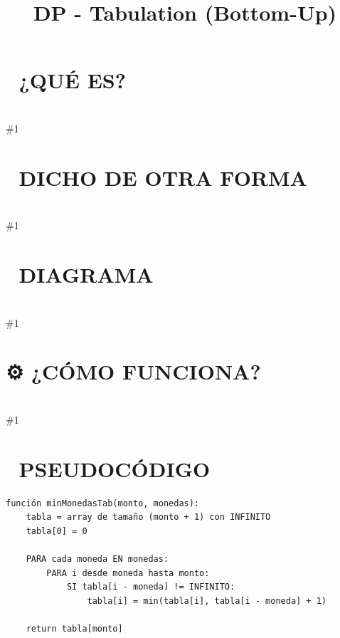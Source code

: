 \documentclass{article}
\newcommand{\quees}[1]{\section*{🤔 ¿QUÉ ES?}\hrulefill \\ \#1}
\newcommand{\dichodeotraforma}[1]{\section*{💬 DICHO DE OTRA FORMA}\hrulefill \\ \#1}
\newcommand{\diagrama}[1]{\section*{🎨 DIAGRAMA}\hrulefill \\ \#1}
\newcommand{\comofunciona}[1]{\section*{⚙️ ¿CÓMO FUNCIONA?}\hrulefill \\ \#1}
\begin{document}
\title{DP - Tabulation (Bottom-Up)}
\date{}
\maketitle
\quees{Construir una pared de ladrillos 🧱 desde el suelo hacia arriba. 

En lugar de empezar por el techo (el problema grande) y tratar de 
adivinar qué ladrillos necesitas abajo (recursión), empiezas poniendo
los primeros ladrillos en la base (los casos base que ya conoces). 

Una vez que tienes la primera fila, puedes poner la segunda encima 
usando la base como apoyo. Vas llenando tu tabla de resultados paso
a paso hasta que llegas a la altura que querías (el resultado final).}
\dichodeotraforma{Tabulation es la técnica de DP basada en Iteración (Bottom-Up). 

Se llama así porque literalmente llenas una tabla (un array de 1D 
o 2D) con los resultados de los sub-problemas, empezando por los 
más pequeños. Cada nueva entrada de la tabla se calcula usando los
valores que ya están guardados en las posiciones anteriores.

Es generalmente más eficiente que Memoization porque evita el 
"overhead" (sobrecosto) de las llamadas recursivas y no corre el 
riesgo de causar un Stack Overflow.}
\diagrama{\begin{verbatim}
Queremos fib(5).
Tabla DP de tamaño 6: [ \_, \_, \_, \_, \_, \_ ]

1. Llenamos bases: dp[0]=0, dp[1]=1
   [ 0, 1, \_, \_, \_, \_ ]

2. Llenamos el resto usando dp[i] = dp[i-1] + dp[i-2]:
   i=2: [ 0, 1, 1, \_, \_, \_ ]
   i=3: [ 0, 1, 1, 2, \_, \_ ]
   i=4: [ 0, 1, 1, 2, 3, \_ ]
   i=5: [ 0, 1, 1, 2, 3, 5 ] 🎉 -> Resultado final
\end{verbatim}}
\comofunciona{1. Inicializa una tabla (array o matriz) con valores default.
2. Define los casos base en las primeras posiciones de la tabla.
3. Escribe un loop (o varios) que recorra la tabla.
4. En cada paso, aplica la lógica para llenar la celda actual 
   usando celdas anteriores.
5. Regresa el valor de la última celda relevante.}
\section*{📝 PSEUDOCÓDIGO}
\hrulefill
\begin{verbatim}
función minMonedasTab(monto, monedas):
    tabla = array de tamaño (monto + 1) con INFINITO
    tabla[0] = 0

    PARA cada moneda EN monedas:
        PARA i desde moneda hasta monto:
            SI tabla[i - moneda] != INFINITO:
                tabla[i] = min(tabla[i], tabla[i - moneda] + 1)

    return tabla[monto]
\end{verbatim}
\end{document}
